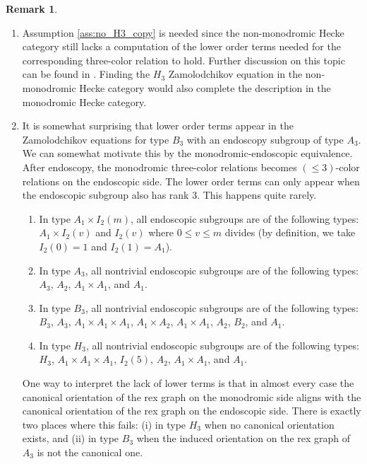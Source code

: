 \documentclass{amsart}
\theoremstyle{definition}
\newtheorem{remark}[subsubsection]{Remark}
\numberwithin{equation}{subsection}
\begin{document}
    \begin{remark}\label{rem:three_color_relns} 
        \begin{enumerate}
            \item   Assumption \ref{ass:no_H3_copy} is needed since the non-monodromic Hecke category still lacks a computation of the lower order terms needed for the corresponding three-color relation to hold. Further discussion on this topic can be found in \cite[\S 3.6]{EW17}.
                    Finding the $H_3$ Zamolodchikov equation in the non-monodromic Hecke category would also complete the description in the monodromic Hecke category.
            \item   It is somewhat surprising that lower order terms appear in the Zamolodchikov equations for type $B_3$ with an endoscopy subgroup of type $A_3$.
                    We can somewhat motivate this by the monodromic-endoscopic equivalence. 
                    After endoscopy, the monodromic three-color relations becomes $(\leq 3)$-color relations on the endoscopic side.
                    The lower order terms can only appear when the endoscopic subgroup also has rank 3. This happens quite rarely. 
                    \begin{enumerate}
                        \item In type $A_1 \times I_2(m)$, all endoscopic subgroups are of the following types: $A_1 \times I_2 (v)$ and $I_2 (v)$ where $0 \leq v \leq m$ divides (by definition, we take $I_2 (0) = 1$ and $I_2 (1) = A_1$).
                        \item In type $A_3$, all nontrivial endoscopic subgroups are of the following types: $A_3$, $A_2$, $A_1 \times A_1$, and $A_1$.
                        \item In type $B_3$, all nontrivial endoscopic subgroups are of the following types: $B_3$, $A_3$, $A_1 \times A_1 \times A_1$, $A_1 \times A_2$, $A_1 \times A_1$, $A_2$,  $B_2$, and $A_1$. 
                        \item In type $H_3$, all nontrivial endoscopic subgroups are of the following types: $H_3$, $A_1 \times A_1 \times A_1$, $I_2 (5)$, $A_2$, $A_1 \times A_1$, and $A_1$.
                    \end{enumerate}
                    One way to interpret the lack of lower terms is that in almost every case the canonical orientation of the rex graph on the monodromic side aligns with the canonical orientation of the rex graph on the endoscopic side.
                    There is exactly two places where this fails: (i) in type $H_3$ when no canonical orientation exists, and (ii) in type $B_3$ when the induced orientation on the rex graph of $A_3$ is not the canonical one. 
        \end{enumerate}
    \end{remark}
\end{document}
